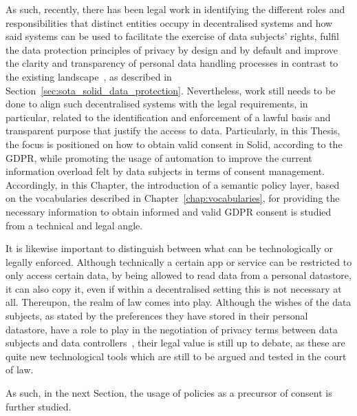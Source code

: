 As such, recently, there has been legal work in identifying the different roles and responsibilities that distinct entities occupy in decentralised systems and how said systems can be used to facilitate the exercise of data subjects' rights, fulfil the data protection principles of privacy by design and by default and improve the clarity and transparency of personal data handling processes in contrast to the existing landscape~\citep{janssen_personal_2020}, as described in Section~\ref{sec:sota_solid_data_protection}.
Nevertheless, work still needs to be done to align such decentralised systems with the legal requirements, in particular, related to the identification and enforcement of a lawful basis and transparent purpose that justify the access to data.  
Particularly, in this Thesis, the focus is positioned on how to obtain valid consent in Solid, according to the GDPR, while promoting the usage of automation to improve the current information overload felt by data subjects in terms of consent management.
Accordingly, in this Chapter, the introduction of a semantic policy layer, based on the vocabularies described in Chapter~\ref{chap:vocabularies}, for providing the necessary information to obtain informed and valid GDPR consent is studied from a technical and legal angle.


It is likewise important to distinguish between what can be technologically or legally enforced.
Although technically a certain app or service can be restricted to only access certain data, by being allowed to read data from a personal datastore, it can also copy it, even if within a decentralised setting this is not necessary at all.
Thereupon, the realm of law comes into play.
Although the wishes of the data subjects, as stated by the preferences they have stored in their personal datastore, have a role to play in the negotiation of privacy terms between data subjects and data controllers~\citep{verborgh_paradigm_2017}, their legal value is still up to debate, as these are quite new technological tools which are still to be argued and tested in the court of law.

As such, in the next Section, the usage of policies as a precursor of consent is further studied.